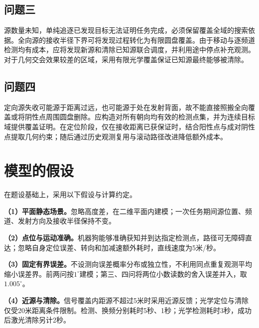\documentclass{JXUSTmodeling}
\begin{document}
\subsection{问题三}\label{sub:2.3}
源数量未知，单纯追逐已发现目标无法证明任务完成，必须保留覆盖全域的搜索依据。全向源的接收半径下界可将发现过程转化为有限圆盘覆盖。由于移动与逐频道检测均有成本，应将发现新源和清除已知源联合调度，并利用途中停点补充观测。对于几何交会效果较差的区域，采用有限光学覆盖保证已知源最终能够被清除。

\subsection{问题四}\label{sub:2.4}
定向源失收可能源于距离过远，也可能源于处在发射背面，故不能直接照搬全向覆盖或将阴性点周围圆盘删除。应构造对所有朝向均有效的检测点集，并为连续目标域提供覆盖证明。在定位阶段，仅在接收距离已获保证时，结合阳性点与成对阴性点提取几何约束；随后通过历史观测复用与滚动路径改进降低额外成本。

\section{模型的假设}\label{sec:3}
在题设基础上，采用以下假设与计算约定。

\textbf{（1）平面静态场景。}忽略高度差，在二维平面内建模；一次任务期间源位置、频道、发射方向及接收半径保持不变。

\textbf{（2）点位与运动准确。}机器狗能够准确获知并到达指定检测点，路径可无障碍直达；忽略自身定位误差、转向和加减速额外耗时，直线速度为5米/秒。

\textbf{（3）固定有界误差。}不设测向误差概率分布或独立性，不利用同点重复观测平均缩小误差界。前两问按$1^\circ$建模；第三、四问将两位小数读数的舍入误差并入，取$1.005^\circ$。

\textbf{（4）近源与清除。}信号覆盖内距源不超过5米时采用近源反馈；光学定位与清除仅受20米距离条件限制。检测、换频分别耗时5秒、1秒；光学检测耗时3秒，成功后激光清除另计2秒。

\clearpage
\end{document}
